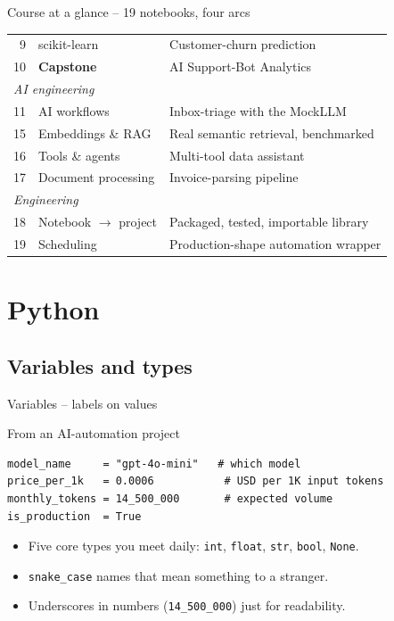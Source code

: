 \documentclass[aspectratio=169,11pt]{beamer}
\begin{document}
\begin{frame}{Course at a glance -- 19 notebooks, four arcs}
\begin{tabular}{rll}
    9  & scikit-learn                   & Customer-churn prediction \\
    10 & \textbf{Capstone}              & AI Support-Bot Analytics \\
    \multicolumn{3}{l}{\textit{AI engineering}} \\
    11 & AI workflows                   & Inbox-triage with the MockLLM \\
    15 & Embeddings \& RAG              & Real semantic retrieval, benchmarked \\
    16 & Tools \& agents                & Multi-tool data assistant \\
    17 & Document processing            & Invoice-parsing pipeline \\
    \multicolumn{3}{l}{\textit{Engineering}} \\
    18 & Notebook $\to$ project         & Packaged, tested, importable library \\
    19 & Scheduling                     & Production-shape automation wrapper \\
    \bottomrule
  \end{tabular}
\end{frame}


\section{Python}

\subsection{Variables and types}

\begin{frame}[fragile]{Variables -- labels on values}
  \begin{exampleblock}{From an AI-automation project}
\begin{lstlisting}
model_name     = "gpt-4o-mini"   # which model
price_per_1k   = 0.0006           # USD per 1K input tokens
monthly_tokens = 14_500_000       # expected volume
is_production  = True
\end{lstlisting}
  \end{exampleblock}
  \begin{itemize}
    \item Five core types you meet daily: \texttt{int}, \texttt{float}, \texttt{str}, \texttt{bool}, \texttt{None}.
    \item \texttt{snake\_case} names that mean something to a stranger.
    \item Underscores in numbers (\texttt{14\_500\_000}) just for readability.
  \end{itemize}
\end{frame}
\end{document}
